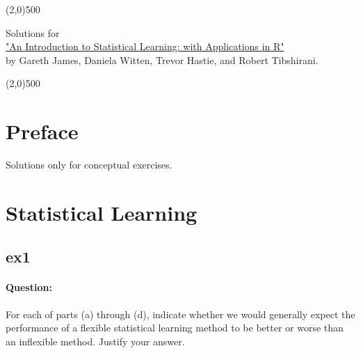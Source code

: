 \documentclass[a4paper,12pt,titlepage]{article} %
\begin{document}
\begin{titlepage}

\begin{center}
	\line(2,0){500}
\end{center}

\vspace{60pt}

\begin{center}	
	{\Large{Solutions for}}\\
	\vspace{20pt}
	\href{http://www.springer.com/us/book/9781461471370}{\Huge{"An Introduction to Statistical Learning: with Applications in R"}}\\
	\vspace{20pt}
	{\LARGE{by Gareth James, Daniela Witten, Trevor Hastie, and Robert Tibshirani.}}\\
\end{center}

\vspace{\fill}
\begin{center}
	\line(2,0){500}
\end{center}

\end{titlepage}

\tableofcontents
\newpage
\section{Preface}

Solutions only for conceptual exercises.

\newpage
\section{Statistical Learning}
\subsection{ex1}
\paragraph{Question:} For each of parts (a) through (d), indicate whether we would generally expect the performance of a flexible statistical learning method to be better or worse than an inflexible method. Justify your answer.
\end{document}
